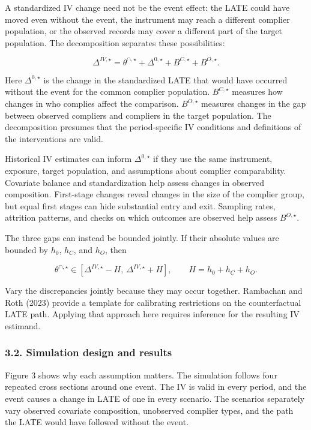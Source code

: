 \documentclass[
  11pt,
]{article}
\begin{document}
A standardized IV change need not be the event effect: the LATE could
have moved even without the event, the instrument may reach a different
complier population, or the observed records may cover a different part
of the target population. The decomposition separates these
possibilities:

\[
\Delta^{IV,\star}
=\theta^{\cap,\star}
+\Delta^{0,\star}
+B^{C,\star}
+B^{O,\star}.
\tag{5}
\]

Here \(\Delta^{0,\star}\) is the change in the standardized LATE that
would have occurred without the event for the common complier
population. \(B^{C,\star}\) measures how changes in who complies affect
the comparison. \(B^{O,\star}\) measures changes in the gap between
observed compliers and compliers in the target population. The
decomposition presumes that the period-specific IV conditions and
definitions of the interventions are valid.

Historical IV estimates can inform \(\Delta^{0,\star}\) if they use the
same instrument, exposure, target population, and assumptions about
complier comparability. Covariate balance and standardization help
assess changes in observed composition. First-stage changes reveal
changes in the size of the complier group, but equal first stages can
hide substantial entry and exit. Sampling rates, attrition patterns, and
checks on which outcomes are observed help assess \(B^{O,\star}\).

The three gaps can instead be bounded jointly. If their absolute values
are bounded by \(h_0\), \(h_C\), and \(h_O\), then

\[
\theta^{\cap,\star}
\in
\left[\Delta^{IV,\star}-H,\ \Delta^{IV,\star}+H\right],
\qquad H=h_0+h_C+h_O.
\tag{6}
\]

Vary the discrepancies jointly because they may occur together.
Rambachan and Roth (2023) provide a template for calibrating
restrictions on the counterfactual LATE path. Applying that approach
here requires inference for the resulting IV estimand.

\Needspace{0.74\textheight}

\hypertarget{simulation-design-and-results}{%
\subsubsection{3.2. Simulation design and
results}\label{simulation-design-and-results}}

Figure 3 shows why each assumption matters. The simulation follows four
repeated cross sections around one event. The IV is valid in every
period, and the event causes a change in LATE of one in every scenario.
The scenarios separately vary observed covariate composition, unobserved
complier types, and the path the LATE would have followed without the
event.
\end{document}
